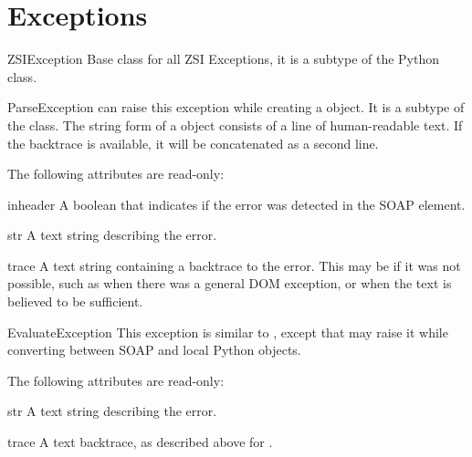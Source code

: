 \chapter{Exceptions}

\begin{excdesc}{ZSIException}
Base class for all ZSI Exceptions, it is a subtype of the Python
 class.
\end{excdesc}

\begin{excdesc}{ParseException}
\ZSI{} can raise this exception while creating a  object.
It is a subtype of the  class.
The string form of a  object consists of a
line of human-readable text.
If the backtrace is available, it will be concatenated as a second line.
\end{excdesc}

The following attributes are read-only:

\begin{memberdesc}{inheader}
A boolean that indicates if the error was detected in the SOAP 
element.
\end{memberdesc}

\begin{memberdesc}{str}
A text string describing the error.
\end{memberdesc}

\begin{memberdesc}{trace}
A text string containing a backtrace to the error.
This may be  if it was not possible, such as when there was
a general DOM exception, or when the  text is believed to be
sufficient.
\end{memberdesc}

\begin{excdesc}{EvaluateException}
This exception is similar to , except
that \ZSI{} may raise it while converting between SOAP and local
Python objects.
\end{excdesc}

The following attributes are read-only:

\begin{memberdesc}{str}
A text string describing the error.
\end{memberdesc}

\begin{memberdesc}{trace}
A text backtrace, as described above for .
\end{memberdesc}

